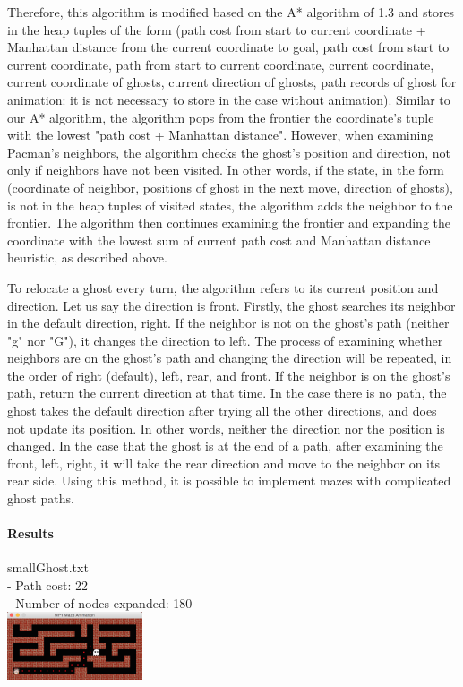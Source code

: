 \begin{multicols*}{2}
Therefore, this algorithm is modified based on the A* algorithm of 1.3 and stores in the heap tuples of the form (path cost from start to current coordinate + Manhattan distance from the current coordinate to goal, path cost from start to current coordinate, path from start to current coordinate, current coordinate, current coordinate of ghosts, current direction of ghosts, path records of ghost for animation: it is not necessary to store in the case without animation). Similar to our A* algorithm, the algorithm pops from the frontier the coordinate's tuple with the lowest "path cost + Manhattan distance". However, when examining Pacman's neighbors, the algorithm checks the ghost's position and direction, not only if neighbors have not been visited. In other words, if the state, in the form (coordinate of neighbor, positions of ghost in the next move, direction of ghosts), is not in the heap tuples of visited states, the algorithm adds the neighbor to the frontier. The algorithm then continues examining the frontier and expanding the coordinate with the lowest sum of current path cost and Manhattan distance heuristic, as described above.

To relocate a ghost every turn, the algorithm refers to its current position and direction. Let us say the direction is front. Firstly, the ghost searches its neighbor in the default direction, right. If the neighbor is not on the ghost's path (neither "g" nor "G"), it changes the direction to left. The process of examining whether neighbors are on the ghost's path and changing the direction will be repeated, in the order of right (default), left, rear, and front. If the neighbor is on the ghost's path, return the current direction at that time. In the case there is no path, the ghost takes the default direction after trying all the other directions, and does not update its position. In other words, neither the direction nor the position is changed. In the case that the ghost is at the end of a path, after examining the front, left, right, it will take the rear direction and move to the neighbor on its rear side. Using this method, it is possible to implement mazes with complicated ghost paths.

\paragraph{Results}
smallGhost.txt\\
- Path cost: 22\\
- Number of nodes expanded: 180\\
\includegraphics[width=0.3\textwidth]{graphics/smallGhosts.png}


\end{multicols*}
